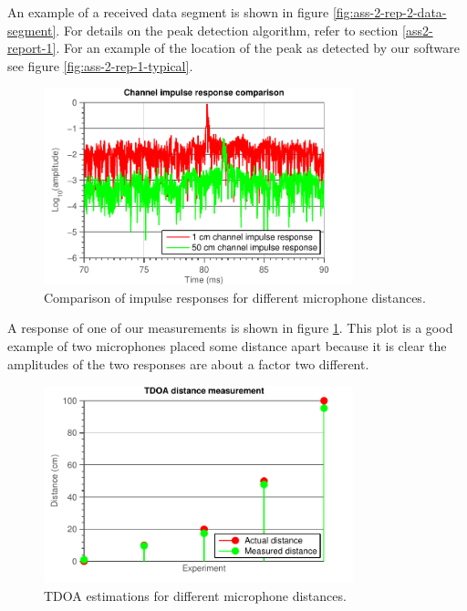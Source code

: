 \documentclass[11pt,titlepage]{report}
\begin{document}
An example of a received data segment is shown in figure \ref{fig:ass-2-rep-2-data-segment}. For details on the peak detection algorithm, refer to section \ref{ass2-report-1}. For an example of the location of the peak as detected by our software see figure \ref{fig:ass-2-rep-1-typical}.

\begin{figure}[H]
	\centering
	\includegraphics[width=0.8\textwidth]{../../deliverable-7-resources/figures/ass-2/report-2-3/ass-2-report-2-impulse-responses-4.pdf}
	\caption{Comparison of impulse responses for different microphone distances.}
	\label{fig:ass-2-rep-2-impulse-1-20}
\end{figure}

A response of one of our measurements is shown in figure \ref{fig:ass-2-rep-2-impulse-1-20}. This plot is a good example of two microphones placed some distance apart because it is clear the amplitudes of the two responses are about a factor two different. 

\begin{figure}[H]
	\centering
	\includegraphics[width=0.8\textwidth]{../../deliverable-7-resources/figures/ass-2/report-2-3/ass-2-report-2-results.pdf}
	\caption{TDOA estimations for different microphone distances.}
	\label{fig:ass-2-rep-2-result}
\end{figure}
\end{document}
